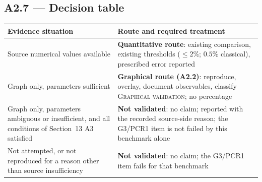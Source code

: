\documentclass[11pt,a4paper]{article}
\begin{document}
\subsection*{A2.7 --- Decision table}
\begin{center}
\begin{tabularx}{\textwidth}{@{}L{6.2cm} Y@{}}
\toprule
Evidence situation & Route and required treatment \\
\midrule
Source numerical values available & \textbf{Quantitative route}: existing comparison, existing thresholds
($\le2\%$; $0.5\%$ classical), prescribed error reported \\
\midrule
Graph only, parameters sufficient & \textbf{Graphical route (A2.2)}: reproduce, overlay, document
observables, classify \textsc{Graphical validation}; no percentage \\
\midrule
Graph only, parameters ambiguous or insufficient, and all conditions of Section~13 A3 satisfied &
\textbf{Not validated}: no claim; reported with the recorded source-side reason; the G3/PCR1 item is not
failed by this benchmark alone \\
\midrule
Not attempted, or not reproduced for a reason other than source insufficiency & \textbf{Not validated}:
no claim; the G3/PCR1 item fails for that benchmark \\
\bottomrule
\end{tabularx}
\end{center}
\end{document}
